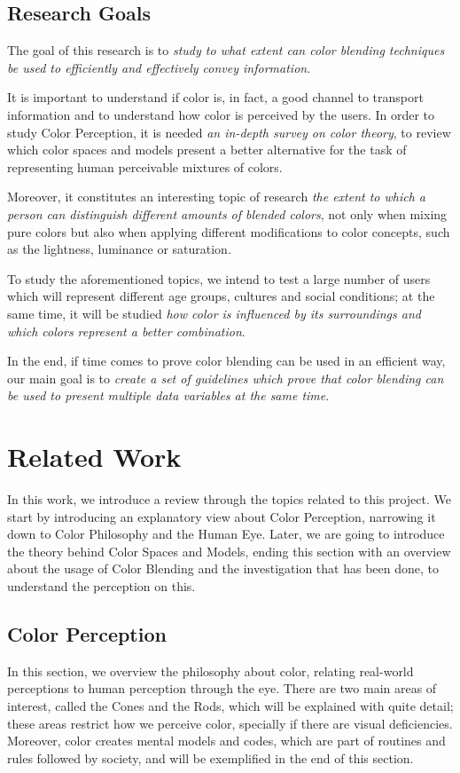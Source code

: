 \documentclass{report}
\begin{document}
\section{Research Goals}

The goal of this research is to \emph{study to what extent can color blending techniques be used to efficiently and
effectively convey information}.\par  
It is important to understand if color is, in fact, a good channel to transport information and to understand how color
is perceived by the users. In order to study Color Perception, it is needed \emph{an in-depth survey on color theory}, to
review which color spaces and models present a better alternative for the task of representing human perceivable mixtures
of colors. \par
Moreover, it constitutes an interesting topic of research \emph{the extent to which a person can distinguish different amounts
of blended colors}, not only when mixing pure colors but also when applying different modifications to color concepts, such
as the lightness, luminance or saturation. \par
To study the aforementioned topics, we intend to test a large number of users which will represent different age groups,
cultures and social conditions; at the same time, it will be studied \emph{how color is influenced by its surroundings and which
colors represent a better combination}. \par
In the end, if time comes to prove color blending can be used in an efficient way, our main goal is to \emph{create a set of
guidelines which prove that color blending can be used to present multiple data variables at the same time}.

\chapter{Related Work}
In this work, we introduce a review through the topics related to this project. We start by introducing
an explanatory view about Color Perception, narrowing it down to Color Philosophy and the Human Eye. Later, we are going to introduce the theory behind Color Spaces and Models, ending this
section with an overview about the usage of Color Blending and the investigation that has been done, to
understand the perception on this.
%
\section{Color Perception}
\label{sec:colorp}
In this section, we overview the philosophy about color, relating real-world perceptions to human perception
through the eye. There are two main areas of interest, called the Cones and the Rods, which will be explained
with quite detail; these areas restrict how we perceive color, specially if there are visual deficiencies. 
Moreover, color creates mental models and codes, which are part of routines and rules followed by society, and will be exemplified in the end of this section.
%
\end{document}

